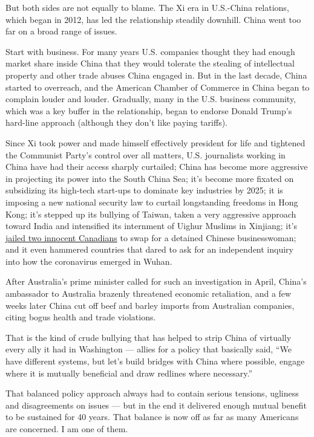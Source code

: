 But both sides are not equally to blame. The Xi era in U.S.-China
relations, which began in 2012, has led the relationship steadily
downhill. China went too far on a broad range of issues.

Start with business. For many years U.S. companies thought they had
enough market share inside China that they would tolerate the stealing
of intellectual property and other trade abuses China engaged in. But in
the last decade, China started to overreach, and the American Chamber of
Commerce in China began to complain louder and louder. Gradually, many
in the U.S. business community, which was a key buffer in the
relationship, began to endorse Donald Trump's hard-line approach
(although they don't like paying tariffs).

Since Xi took power and made himself effectively president for life and
tightened the Communist Party's control over all matters, U.S.
journalists working in China have had their access sharply curtailed;
China has become more aggressive in projecting its power into the South
China Sea; it's become more fixated on subsidizing its high-tech
start-ups to dominate key industries by 2025; it is imposing a new
national security law to curtail longstanding freedoms in Hong Kong;
it's stepped up its bullying of Taiwan, taken a very aggressive approach
toward India and intensified its internment of Uighur Muslims in
Xinjiang; it's
\href{https://www.theglobeandmail.com/canada/article-something-has-to-change-michael-kovrigs-letters-detail-life-in-a/}{jailed
two innocent Canadians} to swap for a detained Chinese businesswoman;
and it even hammered countries that dared to ask for an independent
inquiry into how the coronavirus emerged in Wuhan.

After Australia's prime minister called for such an investigation in
April, China's ambassador to Australia brazenly threatened economic
retaliation, and a few weeks later China cut off beef and barley imports
from Australian companies, citing bogus health and trade violations.

That is the kind of crude bullying that has helped to strip China of
virtually every ally it had in Washington --- allies for a policy that
basically said, ``We have different systems, but let's build bridges
with China where possible, engage where it is mutually beneficial and
draw redlines where necessary.''

That balanced policy approach always had to contain serious tensions,
ugliness and disagreements on issues --- but in the end it delivered
enough mutual benefit to be sustained for 40 years. That balance is now
off as far as many Americans are concerned. I am one of them.


